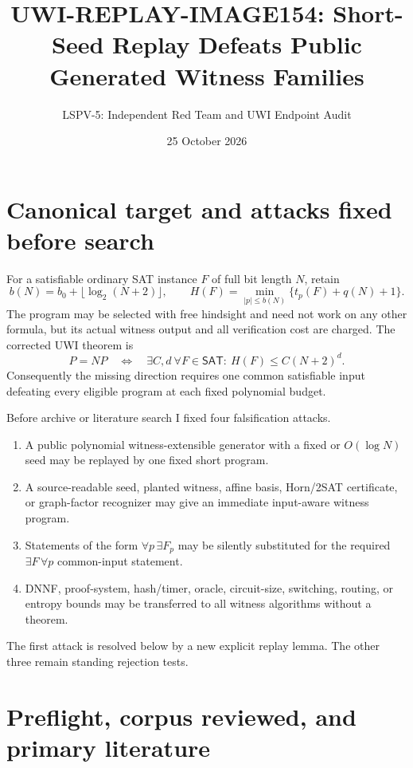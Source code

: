 \documentclass[11pt]{article}
\title{UWI-REPLAY-IMAGE154: Short-Seed Replay Defeats Public Generated Witness Families}
\author{LSPV-5: Independent Red Team and UWI Endpoint Audit}
\date{25 October 2026}
\newcommand{\SAT}{\mathsf{SAT}}
\newcommand{\Hmin}{H}
\begin{document}
\maketitle
\begin{center}
\end{center}

\section{Canonical target and attacks fixed before search}
For a satisfiable ordinary SAT instance $F$ of full bit length $N$, retain
\[
 b(N)=b_0+\lfloor\log_2(N+2)\rfloor,
 \qquad
 \Hmin(F)=\min_{|p|\le b(N)}\{t_p(F)+q(N)+1\}.
\]
The program may be selected with free hindsight and need not work on any other
formula, but its actual witness output and all verification cost are charged.
The corrected UWI theorem is
\[
 P=NP\quad\Longleftrightarrow\quad
 \exists C,d\ \forall F\in\SAT:\ \Hmin(F)\le C(N+2)^d.
\]
Consequently the missing direction requires one common satisfiable input defeating
every eligible program at each fixed polynomial budget.

Before archive or literature search I fixed four falsification attacks.
\begin{enumerate}
\item A public polynomial witness-extensible generator with a fixed or
$O(\log N)$ seed may be replayed by one fixed short program.
\item A source-readable seed, planted witness, affine basis, Horn/2SAT certificate,
or graph-factor recognizer may give an immediate input-aware witness program.
\item Statements of the form $\forall p\,\exists F_p$ may be silently substituted
for the required $\exists F\,\forall p$ common-input statement.
\item DNNF, proof-system, hash/timer, oracle, circuit-size, switching, routing, or
entropy bounds may be transferred to all witness algorithms without a theorem.
\end{enumerate}
The first attack is resolved below by a new explicit replay lemma.  The other three
remain standing rejection tests.

\section{Preflight, corpus reviewed, and primary literature}
\end{document}
